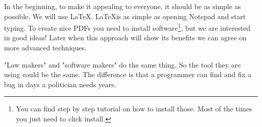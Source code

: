 \documentclass{article}
\begin{document}
In the beginning, to make it appealing to everyone, it should be as simple as possible.
We will use \LaTeX.
\LaTeX is as simple as opening Notepad and start typing.
To create nice PDFs you need to install software\footnote{You can find step by step tutorial on how to install those. Most of the times you just need to click install.}, but we are interested in good ideas!
Later when this approach will show its benefits we can agree on more advanced techniques.

"Law makers" and "software makers" do the same thing.
So the tool they are using could be the same.
The difference is that a programmer can find and fix a bug in days a politician needs years.
\newpage


\end{document}
